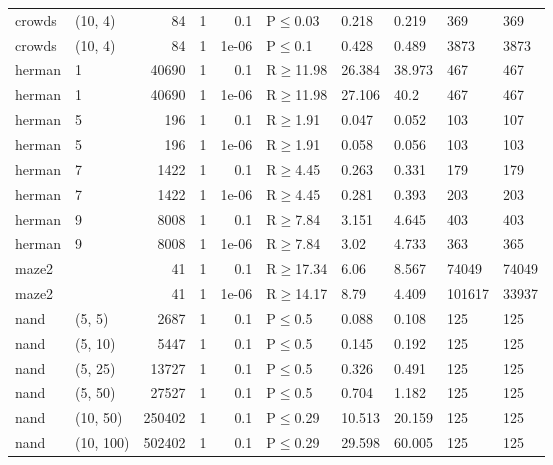 \begin{longtable}{llrrrlllll}
 crowds        & (10, 4)   &     	84 & 1 & 0.1   & P$\leq$0.03  & 0.218   & 0.219   & 369    & 369    \\
 crowds        & (10, 4)   &     	84 & 1 & 1e-06 & P$\leq$0.1   & 0.428   & 0.489   & 3873   & 3873   \\
 herman        & 1         &  	40690 & 1 & 0.1   & R$\geq$11.98 & 26.384  & 38.973  & 467    & 467    \\
 herman        & 1         &  	40690 & 1 & 1e-06 & R$\geq$11.98 & 27.106  & 40.2    & 467    & 467    \\
 herman        & 5         &    	196 & 1 & 0.1   & R$\geq$1.91  & 0.047   & 0.052   & 103    & 107    \\
 herman        & 5         &    	196 & 1 & 1e-06 & R$\geq$1.91  & 0.058   & 0.056   & 103    & 103    \\
 herman        & 7         &   	1422 & 1 & 0.1   & R$\geq$4.45  & 0.263   & 0.331   & 179    & 179    \\
 herman        & 7         &   	1422 & 1 & 1e-06 & R$\geq$4.45  & 0.281   & 0.393   & 203    & 203    \\
 herman        & 9         &   	8008 & 1 & 0.1   & R$\geq$7.84  & 3.151   & 4.645   & 403    & 403    \\
 herman        & 9         &   	8008 & 1 & 1e-06 & R$\geq$7.84  & 3.02    & 4.733   & 363    & 365    \\
 maze2         &           &     	41 & 1 & 0.1   & R$\geq$17.34 & 6.06    & 8.567   & 74049  & 74049  \\
 maze2         &           &     	41 & 1 & 1e-06 & R$\geq$14.17 & 8.79    & 4.409   & 101617 & 33937  \\
 nand          & (5, 5)    &   	2687 & 1 & 0.1   & P$\leq$0.5   & 0.088   & 0.108   & 125    & 125    \\
 nand          & (5, 10)   &   	5447 & 1 & 0.1   & P$\leq$0.5   & 0.145   & 0.192   & 125    & 125    \\
 nand          & (5, 25)   &  	13727 & 1 & 0.1   & P$\leq$0.5   & 0.326   & 0.491   & 125    & 125    \\
 nand          & (5, 50)   &  	27527 & 1 & 0.1   & P$\leq$0.5   & 0.704   & 1.182   & 125    & 125    \\
 nand          & (10, 50)  & 	250402 & 1 & 0.1   & P$\leq$0.29  & 10.513  & 20.159  & 125    & 125    \\
 nand          & (10, 100) & 	502402 & 1 & 0.1   & P$\leq$0.29  & 29.598  & 60.005  & 125    & 125    \\

\end{longtable}
